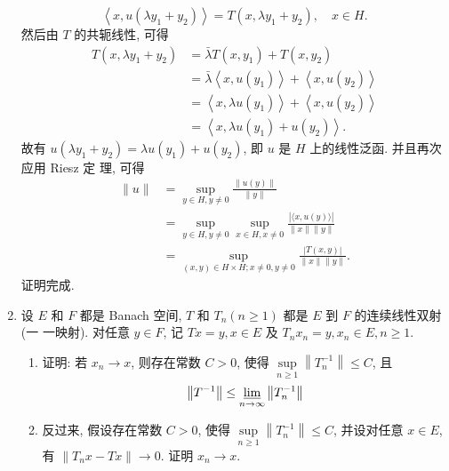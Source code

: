 \begin{enumerate}
\begin{answer}
        \[
        \left\langle x, u\left(\lambda y_{1}+y_{2}\right)\right\rangle=T\left(x, \lambda y_{1}+y_{2}\right), \quad x \in H .
        \]
        然后由 $T$ 的共轭线性, 可得
        \[
        \begin{aligned}
        T\left(x, \lambda y_{1}+y_{2}\right) &=\bar{\lambda} T\left(x, y_{1}\right)+T\left(x, y_{2}\right) \\
        &=\bar{\lambda}\left\langle x, u\left(y_{1}\right)\right\rangle+\left\langle x, u\left(y_{2}\right)\right\rangle \\
        &=\left\langle x, \lambda u\left(y_{1}\right)\right\rangle+\left\langle x, u\left(y_{2}\right)\right\rangle \\
        &=\left\langle x, \lambda u\left(y_{1}\right)+u\left(y_{2}\right)\right\rangle .
        \end{aligned}
        \]
        故有 $u\left(\lambda y_{1}+y_{2}\right)=\lambda u\left(y_{1}\right)+u\left(y_{2}\right)$, 即 $u$ 是 $H$ 上的线性泛函. 并且再次应用 Riesz 定 理, 可得
        \[
        \begin{aligned}
        \|u\| &=\sup _{y \in H, y \neq  0} \frac{\|u(y)\|}{\|y\|} \\
        &=\sup _{y \in H, y \neq  0} \sup _{x \in H, x \neq  0} \frac{|\langle x, u(y)\rangle|}{\|x\|\|y\|} \\
        &=\sup _{(x, y) \in H \times H ; x \neq  0, y \neq  0} \frac{|T(x, y)|}{\|x\|\|y\|} .
        \end{aligned}
        \]
        证明完成.
    \end{answer}
    \item 设 $E$ 和 $F$ 都是 Banach 空间, $T$ 和 $T_{n}(n \geq 1)$ 都是 $E$ 到 $F$ 的连续线性双射 (一 一映射). 对任意 $y \in F$, 记 $T x=y, x \in E$ 及 $T_{n} x_{n}=y, x_{n} \in E, n \geq 1$.
        \begin{enumerate}
            \item 证明: 若 $x_{n} \rightarrow x$, 则存在常数 $C>0$, 使得 $\sup \limits_{n \geq 1}\left\|T_{n}^{-1}\right\| \leq C$, 且
            \[
            \left\|T^{-1}\right\| \leq \varliminf_{n \rightarrow \infty}\left\|T_{n}^{-1}\right\|
            \]
            \item 反过来, 假设存在常数 $C>0$, 使得 $\sup \limits_{n \geq 1}\left\|T_{n}^{-1}\right\| \leq C$, 并设对任意 $x \in E$, 有 $\left\|T_{n} x-T x\right\| \rightarrow 0$. 证明 $x_{n} \rightarrow x$.
        \end{enumerate}
    \begin{answer}
        \begin{enumerate}

\end{enumerate}
\end{answer}
\end{enumerate}
